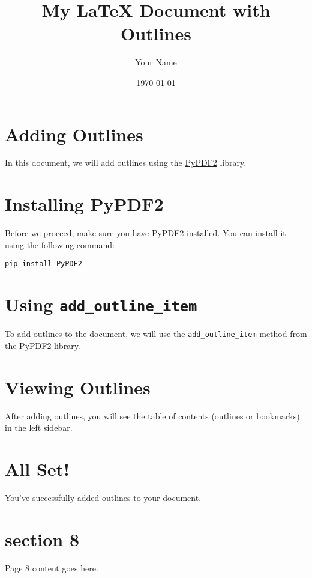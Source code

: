 \documentclass{article}
\title{My LaTeX Document with Outlines}
\author{Your Name}
\date{\today}
\begin{document}
\maketitle

\tableofcontents

\newpage

\section{Adding Outlines}
In this document, we will add outlines using the \href{https://pypdf.readthedocs.io/en/stable/index.html}{PyPDF2} library.

\newpage

\section{Installing PyPDF2}
Before we proceed, make sure you have PyPDF2 installed. You can install it using the following command:

\texttt{pip install PyPDF2}

\newpage

\section{Using \texttt{add\_outline\_item}}
To add outlines to the document, we will use the \texttt{add\_outline\_item} method from the \href{https://pypdf.readthedocs.io/en/latest/modules/PdfMerger.html#pypdf.PdfMerger.add_outline_item}{PyPDF2} library.

\newpage

\section{Viewing Outlines}
After adding outlines, you will see the table of contents (outlines or bookmarks) in the left sidebar.

\newpage

\section{All Set!}
You've successfully added outlines to your document.

\newpage


\section{section 8}
Page 8 content goes here.
\newpage
\end{document}
